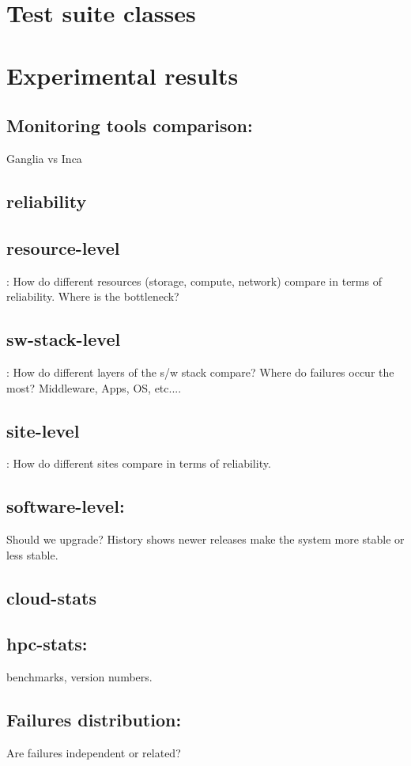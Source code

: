 \documentclass{sig-alternate}
\begin{document}
\section{Test suite classes}

\section{Experimental results}

\subsection{Monitoring tools comparison:} Ganglia vs Inca

\subsection{reliability}

\subsection{resource-level}: How do different resources (storage, compute, network) compare in terms of reliability. Where is the bottleneck?
\subsection{sw-stack-level}: How do different layers of the s/w stack compare? Where do failures occur the most? Middleware, Apps, OS, etc....
\subsection{site-level}: How do different sites compare in terms of reliability.
\subsection{software-level:} Should we upgrade? History shows newer releases make the system more stable or less stable.
\subsection{cloud-stats}
\subsection{hpc-stats:} benchmarks, version numbers.
\subsection{Failures distribution:} Are failures independent or related?
\end{document}
